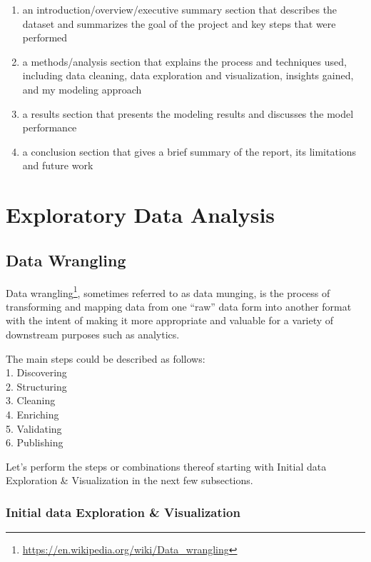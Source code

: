 \documentclass[
]{article}
\DeclareRobustCommand{\href}[2]{#2\footnote{\url{#1}}}
\begin{document}
\begin{enumerate}
\def\labelenumi{\arabic{enumi}.}
\item
  an introduction/overview/executive summary section that describes the
  dataset and summarizes the goal of the project and key steps that were
  performed
\item
  a methods/analysis section that explains the process and techniques
  used, including data cleaning, data exploration and visualization,
  insights gained, and my modeling approach
\item
  a results section that presents the modeling results and discusses the
  model performance
\item
  a conclusion section that gives a brief summary of the report, its
  limitations and future work
\end{enumerate}

\newpage

\hypertarget{exploratory-data-analysis}{%
\section{Exploratory Data Analysis}\label{exploratory-data-analysis}}

\hypertarget{data-wrangling}{%
\subsection{Data Wrangling}\label{data-wrangling}}

\href{https://en.wikipedia.org/wiki/Data_wrangling}{Data wrangling},
sometimes referred to as data munging, is the process of transforming
and mapping data from one ``raw'' data form into another format with the
intent of making it more appropriate and valuable for a variety of
downstream purposes such as analytics.

The main steps could be described as follows:\\
1. Discovering\\
2. Structuring\\
3. Cleaning\\
4. Enriching\\
5. Validating\\
6. Publishing

Let's perform the steps or combinations thereof starting with Initial
data Exploration \& Visualization in the next few subsections.

\hypertarget{initial-data-exploration-visualization}{%
\subsubsection{Initial data Exploration \&
Visualization}\label{initial-data-exploration-visualization}}
\end{document}
